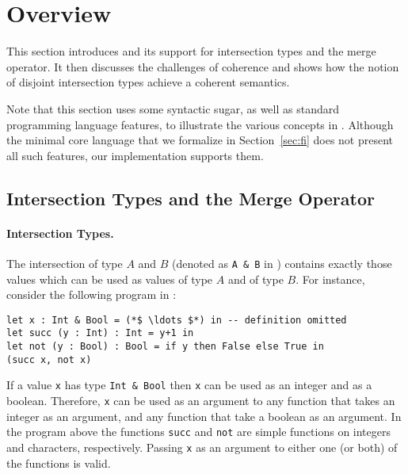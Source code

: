 \section{Overview} \label{sec:overview}

This section introduces \name and its support for intersection types and the
merge operator. It then discusses the challenges of coherence and shows how the
notion of disjoint intersection types achieve a coherent semantics.

Note that this section uses some syntactic sugar, as well as standard
programming language features, to illustrate the various concepts in
\name. Although the minimal core language that we formalize in
Section~\ref{sec:fi} does not present all such features, our implementation
supports them.

\subsection{Intersection Types and the Merge Operator}


\paragraph{Intersection Types.}
The intersection of type $A$ and $B$ (denoted as \lstinline{A & B} in
\name) contains exactly those values
which can be used as values of type $A$ and of type $B$. For instance,
consider the following program in \name:

\begin{lstlisting}
let x : Int & Bool = (*$ \ldots $*) in -- definition omitted
let succ (y : Int) : Int = y+1 in
let not (y : Bool) : Bool = if y then False else True in
(succ x, not x)
\end{lstlisting}

\noindent If a value \lstinline{x} has type \lstinline{Int & Bool} then
\lstinline{x} can be used as an integer and as a boolean. Therefore,
\lstinline{x} can be used as an argument to any function that takes
an integer as an argument, and any
function that take a boolean as an argument. In the program above
the functions \lstinline{succ} and \lstinline{not} are 
simple functions on integers and characters, respectively.
Passing \lstinline{x} as an argument to either one (or both) of the
functions is valid.

